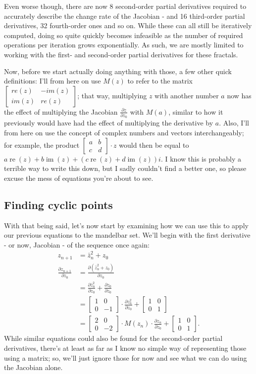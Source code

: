 \documentclass[12pt,a4paper]{article}
\newcommand{\eqar}[1]{\begin{align*} #1 \end{align*}}
\newcommand{\mat}[1]{\begin{bmatrix} #1 \end{bmatrix}}
\newcommand{\jmat}[2]{\frac{\partial #1}{\partial #2}}
\DeclareMathOperator{\re}{re}
\DeclareMathOperator{\im}{im}
\begin{document}
Even worse though, there are now 8 second-order partial derivatives required to accurately describe the change rate of the Jacobian - and 16 third-order partial derivatives, 32 fourth-order ones and so on.
While these can all still be iteratively computed, doing so quite quickly becomes infeasible as the number of required operations per iteration grows exponentially. As such, we are mostly limited to working with the first- and second-order partial derivatives for these fractals.

Now, before we start actually doing anything with those, a few other quick definitions: I'll from here on use $M(z)$ to refer to the matrix $\mat{re(z)&-im(z)\\im(z)&re(z)}$; that way, multiplying $z$ with another number $a$ now has the effect of multiplying the Jacobian $\jmat{z}{z_0}$ with $M(a)$, similar to how it previously would have had the effect of multiplying the derivative by $a$. Also, I'll from here on use the concept of complex numbers and vectors interchangeably; for example, the product $\mat{a&b\\c&d}\cdot z$ would then be equal to $a\re(z)+b\im(z)+(c\re(z)+d\im(z))i$. I know this is probably a terrible way to write this down, but I sadly couldn't find a better one, so please excuse the mess of equations you're about to see.

\subsection{Finding cyclic points}

With that being said, let's now start by examining how we can use this to apply our previous equations to the mandelbar set. We'll begin with the first derivative - or now, Jacobian - of the sequence once again:
\eqar{
	z_{n+1} &= \bar{z}_n^2+z_0\\
	\jmat{z_{n+1}}{z_0} &= \jmat{(\bar{z}_n^2+z_0)}{z_0}\\
	&= \jmat{\bar{z}_n^2}{z_0}+\jmat{z_0}{z_0}\\
	&= \mat{1&0\\0&-1}\cdot\jmat{z_n^2}{z_0}+\mat{1&0\\0&1}\\
	&= \mat{2&0\\0&-2}\cdot M(z_n)\cdot\jmat{z_n}{z_0}+\mat{1&0\\0&1}.
}
While similar equations could also be found for the second-order partial derivatives, there's at least as far as I know no simple way of representing those using a matrix; so, we'll just ignore those for now and see what we can do using the Jacobian alone.
\end{document}
